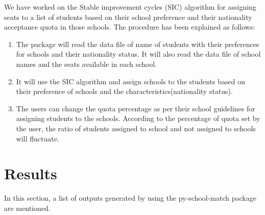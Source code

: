 \documentclass[twocolumn]{article}
\begin{document}
We have worked on the Stable improvement cycles (SIC) algorithm for assigning seats to a list of students based on their school preference and their nationality acceptance quota in those schools. The procedure has been explained as follows:\\
\begin{enumerate}
    \vspace{-0.4cm}\item The package will read the data file of name of students with their preferences for schools and their nationality status. It will also read the data file of school names and the seats available in each school.\\
    \vspace{-0.4cm}\item It will use the SIC algorithm and assign schools to the students based on their preference of schools and the characteristics(nationality status).\\
    \vspace{-0.4cm}\item The users can change the quota percentage as per their school guidelines for assigning students to the schools. According to the percentage of quota set by the user, the ratio of students assigned to school and not assigned to schools will fluctuate.\\
\end{enumerate}

\section{Results}

In this section, a list of outputs generated by using the py-school-match package are mentioned.\\
\end{document}
